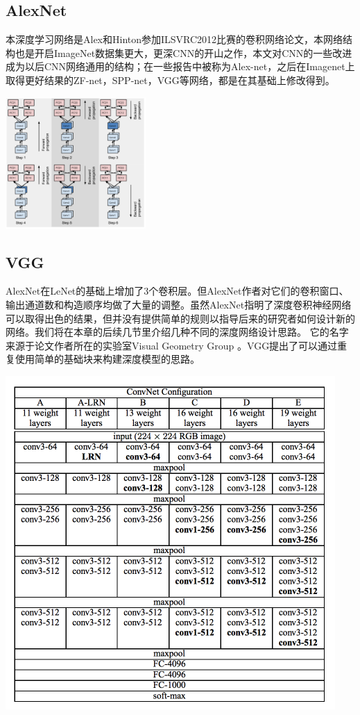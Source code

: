 \documentclass[UTF8]{ctexart}
\begin{document}
\subsection{AlexNet}
本深度学习网络是Alex和Hinton参加ILSVRC2012比赛的卷积网络论文，本网络结构也是开启ImageNet数据集更大，更深CNN的开山之作，本文对CNN的一些改进成为以后CNN网络通用的结构；在一些报告中被称为Alex-net，之后在Imagenet上取得更好结果的ZF-net，SPP-net，VGG等网络，都是在其基础上修改得到。\cite{NIPS2012_4824}
\begin{center}
\includegraphics[height = 5cm]{alexnet.png}
\end{center}
\subsection{VGG}
AlexNet在LeNet的基础上增加了3个卷积层。但AlexNet作者对它们的卷积窗口、输出通道数和构造顺序均做了大量的调整。虽然AlexNet指明了深度卷积神经网络可以取得出色的结果，但并没有提供简单的规则以指导后来的研究者如何设计新的网络。我们将在本章的后续几节里介绍几种不同的深度网络设计思路。
它的名字来源于论文作者所在的实验室Visual Geometry Group 。\cite{simonyan2014deep}VGG提出了可以通过重复使用简单的基础块来构建深度模型的思路。
\begin{center}
\includegraphics[scale=0.4]{vgg.png}
\end{center}
\end{document}
